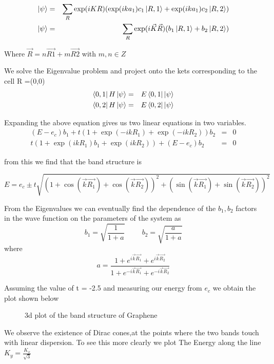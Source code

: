 \documentclass[a4paper]{article}
\begin{document}
\begin{eqnarray}
    \ket{\psi}&=&\sum_{R}\exp(iKR)(\exp(ika_{1})c_{1}\ket{R,1} + \exp(ika_{1})c_{2}\ket{R,2} )\\
	\ket{\psi}&=&\sum_{R}\exp(i\vec{K}\vec{R})(b_{1}\ket{R,1} + b_{2}\ket{R,2} )
\end{eqnarray}


Where $\vec{R} = n\vec{R1} + m\vec{R2} $  with $m,n \in Z$


We solve the Eigenvalue problem and project onto the kets corresponding to the cell R =(0,0) 
\begin{eqnarray}
\bra{0,1}H\ket{\psi}&=&E\bra{0,1}\ket{\psi}\\
\bra{0,2}H\ket{\psi}&=&E\bra{0,2}\ket{\psi}
\end{eqnarray}

Expanding the above equation gives us two linear equations in two variables. 
\begin{eqnarray}
(E-e_{c})b_1  +  t(1 + \exp(-ikR_{1}) + \exp(-ikR_{2}))b_2 & = & 0\\
 t(1 + \exp(ikR_{1})b_1  +     \exp(ikR_{2})) + (E-e_{c})b_2 & = &  0
\end{eqnarray}

from this we find that the band structure is

\begin{equation}
E = e_c \pm t\sqrt{(1 + \cos(\vec{k}\vec{R_{1}}) + \cos(\vec{k}\vec{R_{2}}) )^2  + ( \sin(\vec{k}\vec{R_{1}}) + \sin(\vec{k}\vec{R_{2}}) )^2  }
\end{equation}

From the Eigenvalues we can eventually find the dependence of the $b_1,b_2$ factors in the wave function on the parameters of the system as 
\begin{equation}
b_1 = \sqrt{\frac{1}{1+a}}
\hspace{1cm}
b_2 = \sqrt{\frac{a}{1+a}}
\end{equation}
where
\begin{equation*}
a = \frac{1 + e^{i\vec{k}\vec{R_{1}}} + e^{i\vec{k}\vec{R_{2}}}}{1 + e^{-i\vec{k}\vec{R_{1}}} + e^{-i\vec{k}\vec{R_{2}}}}
\end{equation*}

Assuming the value of t = -2.5 and measuring our energy from $e_{c}$
we obtain the plot shown below
\begin{figure}[h]

\centering
\caption{\label{fig:frog}3d plot of the band structure of Graphene}
\end{figure}
\clearpage
We observe the existence of Dirac cones,at the points where the two bands touch with linear dispersion. To see this more clearly we plot The Energy along the line $K_{y} = \frac{K_{x}}{\sqrt{3}}$
\end{document}
